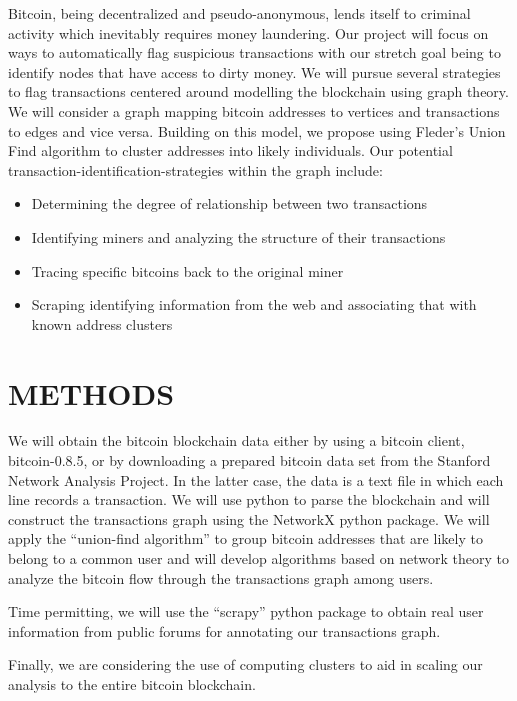 \documentclass[letterpaper, 10 pt, conference]{ieeeconf}  %
\begin{document}
Bitcoin, being decentralized and pseudo-anonymous, lends itself to criminal activity which inevitably requires money laundering. Our project will focus on ways to automatically flag suspicious transactions with our stretch goal being to identify nodes that have access to dirty money. We will pursue several strategies to flag transactions centered around modelling the blockchain using graph theory. We will consider a graph mapping bitcoin addresses to vertices and transactions to edges and vice versa. Building on this model, we propose using Fleder’s \cite{fleder2015} Union Find algorithm to cluster addresses into likely individuals. Our potential transaction-identification-strategies within the graph include:

\begin{itemize}

\item Determining the degree of relationship between two transactions
\item Identifying miners and analyzing the structure of their transactions
\item Tracing specific bitcoins back to the original miner
\item Scraping identifying information from the web and associating that with known address clusters

\end{itemize}

\section{METHODS}

We will obtain the bitcoin blockchain data either by using a bitcoin client, bitcoin-0.8.5, or by downloading a prepared bitcoin data set from the Stanford Network Analysis Project. In the latter case, the data is a text file in which each line records a transaction. We will use python to parse the blockchain and will construct the transactions graph using the NetworkX python package. We will apply the “union-find algorithm” to group bitcoin addresses that are likely to belong to a common user and will develop algorithms based on network theory to analyze the bitcoin flow through the transactions graph among users.

Time permitting, we will use the “scrapy” python package to obtain real user information from public forums for annotating our transactions graph.

Finally, we are considering the use of computing clusters to aid in scaling our analysis to the entire bitcoin blockchain.
\end{document}
